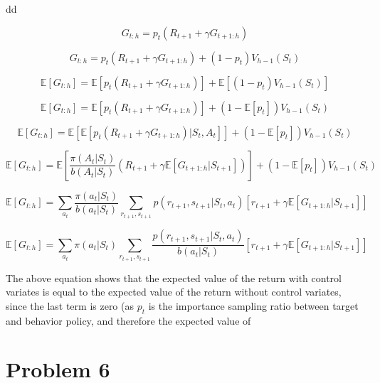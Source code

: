 \documentclass{article}
\begin{document}
dd

\begin{equation}
    G_{t:h} = p_t(R_{t+1} + \gamma G_{t+1:h})
\end{equation}

\begin{equation}
    G_{t:h} = p_t(R_{t+1}+\gamma G_{t+1:h}) + (1-p_t) V_{h-1} (S_t)
\end{equation}

\begin{equation}
    \mathbb{E}[G_{t:h}] = \mathbb{E}[p_t(R_{t+1} + \gamma G_{t+1:h})] + \mathbb{E}[(1-p_t) V_{h-1} (S_t)]
\end{equation}

\begin{equation}
    \mathbb{E}[G_{t:h}] = \mathbb{E}[p_t(R_{t+1} + \gamma G_{t+1:h})] + (1-\mathbb{E}[p_t]) V_{h-1} (S_t)
\end{equation}

\begin{equation}
    \mathbb{E}[G_{t:h}] = \mathbb{E}[\mathbb{E}[p_t(R_{t+1} + \gamma G_{t+1:h})|S_t,A_t]] + (1-\mathbb{E}[p_t]) V_{h-1} (S_t)
\end{equation}

\begin{equation}
    \mathbb{E}[G_{t:h}] = \mathbb{E}[\frac{\pi(A_t|S_t)}{b(A_t|S_t)}(R_{t+1} + \gamma \mathbb{E}[G_{t+1:h}|S_{t+1}])] + (1-\mathbb{E}[p_t]) V_{h-1} (S_t)
\end{equation}

\begin{equation}
    \mathbb{E}[G_{t:h}] = \sum_{a_t}\frac{\pi(a_t|S_t)}{b(a_t|S_t)}\sum_{r_{t+1},s_{t+1}}p(r_{t+1},s_{t+1}|S_t,a_t)[r_{t+1} + \gamma \mathbb{E}[G_{t+1:h}|S_{t+1}]]
\end{equation}

\begin{equation}
    \mathbb{E}[G_{t:h}] = \sum_{a_t}\pi(a_t|S_t)\sum_{r_{t+1},s_{t+1}}\frac{p(r_{t+1},s_{t+1}|S_t,a_t)}{b(a_t|S_t)}[r_{t+1} + \gamma \mathbb{E}[G_{t+1:h}|S_{t+1}]]
\end{equation}

The above equation shows that the expected value of the return with control variates is equal to the expected value of the return without control variates, since the last term is zero (as $p_t$ is the importance sampling ratio between target and behavior policy, and therefore the expected value of


\section*{Problem 6}
\end{document}
